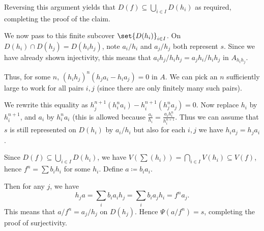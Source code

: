 Reversing this argument yields that $D(f) \subseteq \bigcup_{i \in I} D(h_i)$ as
required, completing the proof of the claim.

We now pass to this finite subcover $\set{D(h_i)}_{i \in I}$. On
$D(h_i)\cap D(h_j) = D(h_ih_j)$, note $a_i/h_i$ and $a_j/h_j$ both represent $s$. Since we
have already shown injectivity, this means that $a_ih_j/h_ih_j = a_jh_i/h_ih_j$ in $A_{h_ih_j}$.

Thus, for some $n$, $(h_ih_j)^n(h_ja_i - h_ia_j) = 0$ in $A$. We can pick an $n$
sufficiently large to work for all pairs $i, j$ (since there are only finitely many
such pairs).

We rewrite this equality as $h_j^{n+1}(h_i^na_i) - h_i^{n+1}(h_j^na_j) = 0$.
Now replace $h_i$ by $h_i^{n+1}$, and $a_i$ by $h_i^na_i$ (this is allowed because
$\frac{a_i}{h_i}= \frac{a_ih_i^n}{h_i^{n+1}}$. Thus we can assume that $s$ is still
represented on $D(h_i)$ by $a_i/h_i$ but also for each $i, j$ we have $h_ia_j = h_ja_i$.

Since $D(f) \subseteq \bigcup_{i \in I} D(h_i)$, we have
$V(\sum (h_i)) = \bigcap_{i \in I} V(h_i) \subseteq V(f)$, hence
$f^n = \sum b_ih_i$ for some $h_i$. Define $a\coloneqq b_i a_i$.

Then for any $j$, we have \[ h_ja = \sum_i b_ia_ih_j = \sum_i b_ia_jh_i = f^na_j. \]
This means that $a/f^n = a_j/h_j$ on $D(h_j)$. Hence $\Psi(a/f^n) = s$, completing
the proof of surjectivity.
